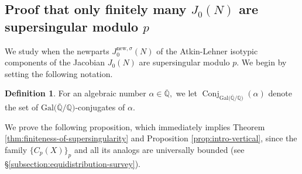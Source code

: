 \documentclass[11pt,letterpaper,reqno]{amsart}
\theoremstyle{definition}
\newtheorem{definition}[theorem]{Definition}
\numberwithin{equation}{section}
\numberwithin{figure}{section}
\numberwithin{table}{section}
\let\subsectiontemp\subsection
\renewcommand{\subsection}[1]{ 
    \subsectiontemp{#1} \hfill\vspace{0.5\linespacing} 
}
\newcommand{\nw}{\mathrm{new}}
\begin{document}
\subsection{Proof that only finitely many \texorpdfstring{$J_0(N)$}{J0(N)} are supersingular modulo \texorpdfstring{$p$}{p}}\label{subsection:proof-of-main-vertical-theorem}

We study when the newparts $J_0^{\nw,\sigma}(N)$ of the Atkin-Lehner isotypic components of the Jacobian $J_0(N)$ are supersingular modulo $p$. We begin by setting the following notation.

\begin{definition}
    For an algebraic number $\alpha \in \overline{\mathbb{Q}},$ we let
$\operatorname{Conj}_{\operatorname{Gal(\overline{\mathbb{Q}}/\mathbb{Q}})} ( \alpha)$
denote the set of $\operatorname{Gal(\overline{\mathbb{Q}}/\mathbb{Q}})$-conjugates of $\alpha.$
\end{definition}

We prove the following proposition, which immediately implies Theorem \ref{thm:finiteness-of-supersingularity} and Proposition \ref{prop:intro-vertical}, since the family $\{ C_p(X) \}_p$ and all its analogs are universally bounded (see \S\ref{subsection:equidistribution-survey}).
\end{document}
